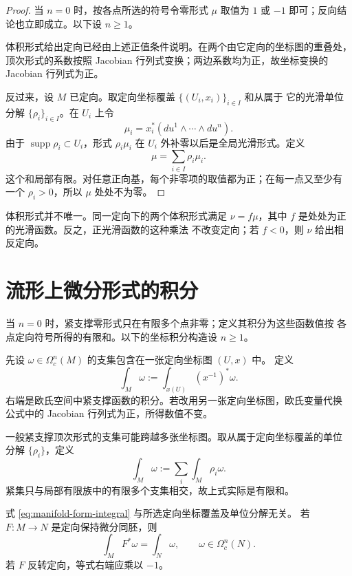 \begin{proof}
当 $n=0$ 时，按各点所选的符号令零形式 $\mu$ 取值为 $1$ 或 $-1$
即可；反向结论也立即成立。以下设 $n\ge1$。

体积形式给出定向已经由上述正值条件说明。在两个由它定向的坐标图的重叠处，
顶次形式的系数按照 Jacobian 行列式变换；两边系数均为正，故坐标变换的
Jacobian 行列式为正。

反过来，设 $M$ 已定向。取定向坐标覆盖 $\{(U_i,x_i)\}_{i\in I}$ 和从属于
它的光滑单位分解 $\{\rho_i\}_{i\in I}$。在 $U_i$ 上令
\[
 \mu_i=x_i^*(du^1\wedge\cdots\wedge du^n).
\]
由于 $\operatorname{supp}\rho_i\subset U_i$，形式 $\rho_i\mu_i$ 在
$U_i$ 外补零以后是全局光滑形式。定义
\[
 \mu=\sum_{i\in I}\rho_i\mu_i.
\]
这个和局部有限。对任意正向基，每个非零项的取值都为正；在每一点又至少有
一个 $\rho_i>0$，所以 $\mu$ 处处不为零。
\end{proof}

体积形式并不唯一。同一定向下的两个体积形式满足
$\nu=f\mu$，其中 $f$ 是处处为正的光滑函数。反之，正光滑函数的这种乘法
不改变定向；若 $f<0$，则 $\nu$ 给出相反定向。

\section{流形上微分形式的积分}

当 $n=0$ 时，紧支撑零形式只在有限多个点非零；定义其积分为这些函数值按
各点定向符号所得的有限和。以下的坐标积分构造设 $n\ge1$。

先设 $\omega\in\Omega_c^n(M)$ 的支集包含在一张定向坐标图 $(U,x)$ 中。
定义
\[
 \int_M\omega
 :=\int_{x(U)}(x^{-1})^*\omega.
\]
右端是欧氏空间中紧支撑函数的积分。若改用另一张定向坐标图，欧氏变量代换
公式中的 Jacobian 行列式为正，所得数值不变。

一般紧支撑顶次形式的支集可能跨越多张坐标图。取从属于定向坐标覆盖的单位
分解 $\{\rho_i\}$，定义
\begin{equation}\label{eq:manifold-form-integral}
 \int_M\omega:=\sum_i\int_M\rho_i\omega.
\end{equation}
紧集只与局部有限族中的有限多个支集相交，故上式实际是有限和。

\begin{proposition}\label{prop:manifold-integral-well-defined}
式 \eqref{eq:manifold-form-integral} 与所选定向坐标覆盖及单位分解无关。
若 $F:M\to N$ 是定向保持微分同胚，则
\[
 \int_MF^*\omega=\int_N\omega,
 \qquad \omega\in\Omega_c^n(N).
\]
若 $F$ 反转定向，等式右端应乘以 $-1$。
\end{proposition}


